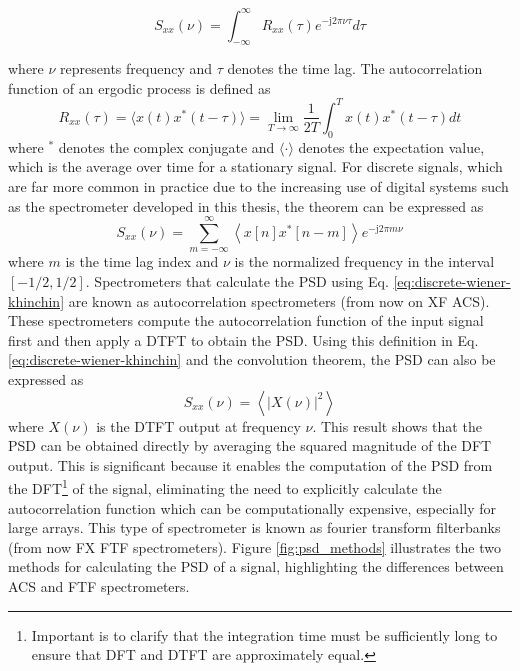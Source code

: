 \begin{equation}
	S_{xx}(\nu) = \int_{-\infty}^{\infty} R_{xx}(\tau) e^{- \mathrm{j} 2\pi \nu \tau} d\tau
	\label{eq:continous-wiener-khinchin}
\end{equation}

where $\nu$ represents frequency and $\tau$ denotes the time lag. The autocorrelation function of an ergodic process is defined as \citep{Gubner_2006}
\begin{equation}
	R_{xx}(\tau) =  \langle x(t) x^*(t - \tau)\rangle = \lim_{T \to \infty} \frac{1}{2T} \int_{0}^{T} x(t) x^*(t - \tau) dt
	\label{eq:continous_autocorrelation}
\end{equation}
where $^*$ denotes the complex conjugate and $\langle \cdot \rangle$ denotes the expectation value, which is the average over time for a stationary signal. For discrete signals, which are far more common in practice due to the increasing use of digital systems such as the spectrometer developed in this thesis, the theorem can be expressed as
\begin{equation}
	S_{xx}(\nu) = \sum_{m=-\infty}^{\infty} \left\langle x[n] x^*[n - m] \right\rangle e^{-\mathrm{j}2\pi m \nu}
	\label{eq:discrete-wiener-khinchin}
\end{equation}
where $m$ is the time lag index and $\nu$ is the normalized frequency in the interval $[-1/2,1/2]$. Spectrometers that calculate the PSD using Eq. \ref{eq:discrete-wiener-khinchin} are known as autocorrelation spectrometers (from now on XF ACS). These spectrometers compute the autocorrelation function of the input signal first and then apply a DTFT to obtain the PSD. Using this definition in Eq. \ref{eq:discrete-wiener-khinchin} and the convolution theorem, the PSD can also be expressed as
\begin{equation}
	S_{xx}(\nu) = \left\langle |X(\nu)|^2 \right\rangle
	\label{eq:discrete_psd}
\end{equation}
where $X(\nu)$ is the DTFT output at frequency $\nu$. This result shows that the PSD can be obtained directly by averaging the squared magnitude of the DFT output. This is significant because it enables the computation of the PSD from the DFT\footnote{Important is to clarify that the integration time must be sufficiently long to ensure that DFT and DTFT are approximately equal.} of the signal, eliminating the need to explicitly calculate the autocorrelation function which can be computationally expensive, especially for large arrays. This type of spectrometer is known as fourier transform filterbanks (from now FX FTF spectrometers). Figure \ref{fig:psd_methods} illustrates the two methods for calculating the PSD of a signal, highlighting the differences between ACS and FTF spectrometers.
